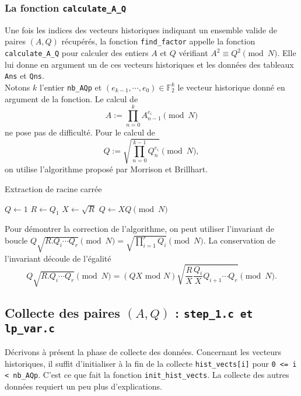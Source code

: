 \newpage 
\subsubsection{La fonction \texttt{calculate\_A\_Q}}

Une fois les indices des vecteurs historiques indiquant un ensemble valide de paires 
$(A, Q)$ récupérés, la fonction \texttt{find\_factor} appelle la fonction
\texttt{calculate\_A\_Q} pour calculer des entiers $A$ et $Q$ vérifiant
$A^2 \equiv Q^2 \pmod{N}$. Elle lui donne en argument un de ces vecteurs
historiques et les données des tableaux \texttt{Ans} et \texttt{Qns}. \\

Notons $k$ l'entier \texttt{nb\_AQp} et $(e_{k-1}, \cdots , e_0) \in \mathbb{F}_2^{k}$ le vecteur 
historique donné en argument de la fonction. Le calcul de
\[A:= \prod_{n=0}^{k} A_{n-1}^{e_i} \pmod{N} \] ne pose pas de 
difficulté. Pour le calcul de \[Q:= \sqrt{\prod_{n=0}^{k-1 } Q_n ^{e_i}}
\pmod{N},\]
on utilise l'algorithme proposé par Morrison et Brillhart.

\vspace{1em}
\begin{algorithm}[H]
\DontPrintSemicolon
\caption{\sc Extraction de racine carrée}
$Q \gets 1$\;
$R \gets Q_1$\;
$X \gets \sqrt{R}$\;
    $Q \gets XQ \pmod{N}$\;
\;
\end{algorithm}
\vspace{1em}

Pour démontrer la correction de l'algorithme, on peut utiliser l'invariant de 
boucle $Q\sqrt{R.Q_i\cdots Q_r} \pmod{N} = \sqrt{\prod_{i=1}^r Q_{i}}
\pmod{N}$. La conservation de l'invariant découle de l'égalité
\[  Q\sqrt{R.Q_i\cdots Q_r} \pmod{N} = 
(QX\text{ mod }N) \sqrt{ \frac{R}{X}\frac{Q_i}{X}Q_{i+1} \cdots Q_r} \pmod{N}.\]

\subsection{Collecte des paires $(A,Q)$ : \texttt{step\_1.c et lp\_var.c}}

Décrivons à présent la phase de collecte des données. Concernant les vecteurs
historiques, il suffit d'initialiser à la fin de la 
collecte \texttt{hist\_vects[i]} pour \texttt{0 <= i < nb\_AQp}. C'est ce que fait 
la fonction \texttt{init\_hist\_vects}. La collecte des autres données 
requiert un peu plus d'explications. 

